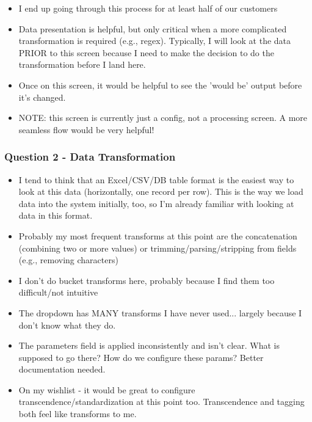 \documentclass[12pt,letterpaper]{article}
\begin{document}
\begin{itemize}
    \item I end up going through this process for at least half of our customers
    \item Data presentation is helpful, but only critical when a more complicated transformation is required (e.g., regex). Typically, I will look at the data PRIOR to this screen because I need to make the decision to do the transformation before I land here. 
    \item Once on this screen, it would be helpful to see the 'would be' output before it's changed.
    \item NOTE: this screen is currently just a config, not a processing screen. A more seamless flow would be very helpful!
\end{itemize}

\subsubsection*{Question 2 - Data Transformation}
\begin{itemize}
    \item I tend to think that an Excel/CSV/DB table format is the easiest way to look at this data (horizontally, one record per row). This is the way we load data into the system initially, too, so I'm already familiar with looking at data in this format. 
    \item Probably my most frequent transforms at this point are the concatenation (combining two or more values) or trimming/parsing/stripping from fields (e.g., removing characters)
    \item I don't do bucket transforms here, probably because I find them too difficult/not intuitive
    \item The dropdown has MANY transforms I have never used... largely because I don't know what they do. 
    \item The parameters field is applied inconsistently and isn't clear. What is supposed to go there? How do we configure these params? Better documentation needed.
    \item On my wishlist - it would be great to configure transcendence/standardization at this point too. Transcendence and tagging both feel like transforms to me.
\end{itemize}
\end{document}
